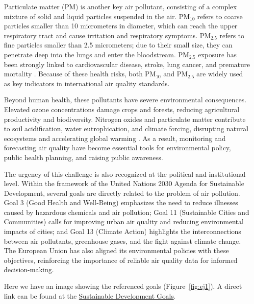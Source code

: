 Particulate matter (PM) is another key air pollutant, consisting of a complex mixture of solid and liquid particles suspended in the air. PM$_{10}$ refers to coarse particles smaller than 10 micrometers in diameter, which can reach the upper respiratory tract and cause irritation and respiratory symptoms. PM$_{2.5}$ refers to fine particles smaller than 2.5 micrometers; due to their small size, they can penetrate deep into the lungs and enter the bloodstream. PM$_{2.5}$ exposure has been strongly linked to cardiovascular disease, stroke, lung cancer, and premature mortality \cite{whoTypesPollutants, zarkeba2024relationship, xie2021toxicity, thangavel2022recent}. Because of these health risks, both PM$_{10}$ and PM$_{2.5}$ are widely used as key indicators in international air quality standards.

Beyond human health, these pollutants have severe environmental consequences. Elevated ozone concentrations damage crops and forests, reducing agricultural productivity and biodiversity. Nitrogen oxides and particulate matter contribute to soil acidification, water eutrophication, and climate forcing, disrupting natural ecosystems and accelerating global warming \cite{agathokleous2020ozone, europaQualityEurope}. As a result, monitoring and forecasting air quality have become essential tools for environmental policy, public health planning, and raising public awareness.

The urgency of this challenge is also recognized at the political and institutional level. Within the framework of the United Nations 2030 Agenda for Sustainable Development, several goals are directly related to the problem of air pollution. Goal 3 (Good Health and Well-Being) emphasizes the need to reduce illnesses caused by hazardous chemicals and air pollution; Goal 11 (Sustainable Cities and Communities) calls for improving urban air quality and reducing environmental impacts of cities; and Goal 13 (Climate Action) highlights the interconnections between air pollutants, greenhouse gases, and the fight against climate change. The European Union has also aligned its environmental policies with these objectives, reinforcing the importance of reliable air quality data for informed decision-making.


Here we have an image showing the referenced goals (Figure~\ref{fig:ej1}). 
A direct link can be found at the \href{https://sdgs.un.org/goals}{Sustainable Development Goals}.


